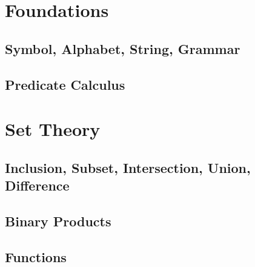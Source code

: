 \section{Foundations}
\subsection{Symbol, Alphabet, String, Grammar}





\subsection{Predicate Calculus}
%
\section{Set Theory}
\subsection{Inclusion, Subset, Intersection, Union, Difference}









\subsection{Binary Products}




\subsection{Functions}









